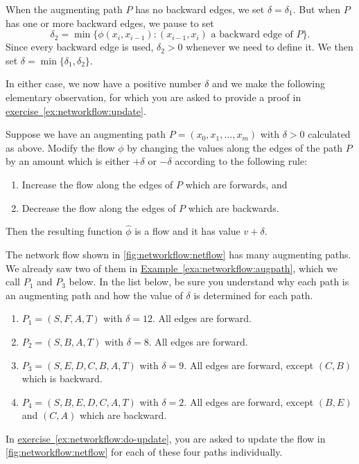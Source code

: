 When the augmenting path $P$ has no backward edges, we set $\delta=
\delta_1$.  But when $P$ has one or more backward edges, we pause
to set
\[
\delta_2 =\min\{\phi(x_{i},x_{i-1}):(x_{i-1},x_i) 
\text{ a backward edge of } P\}.
\]
Since every backward edge is used, $\delta_2>0$ whenever we need to
define it. We then set $\delta=\min\{\delta_1,\delta_2\}$.

In either case, we now have a positive number $\delta$ and we make the
following elementary observation, for which you are asked to provide a
proof in
\hyperref[ex:networkflow:update]{exercise~\ref*{ex:networkflow:update}}.

\begin{proposition}\label{prop:networkflow:update}
  Suppose we have an augmenting path $P=(x_0,x_1,\dots,x_m)$ with
  $\delta>0$ calculated as above.  Modify the flow $\phi$ by changing
  the values along the edges of the path $P$ by an amount which is
  either $+\delta$ or $-\delta$ according to the following rule:
\begin{enumerate}
\item Increase the flow along the edges of $P$ which are
forwards, and
\item Decrease the flow along the edges of $P$ which are
backwards.
\end{enumerate}
Then the resulting function $\hat{\phi}$ is a flow and it
has value $v+\delta$.
\end{proposition}

\begin{example} \label{exa:networkflow:delta}The network flow shown in
  \autoref{fig:networkflow:netflow} has many augmenting paths. We
  already saw two of them in
  \hyperref[exa:networkflow:augpath]{Example~\ref*{exa:networkflow:augpath}},
  which we call $P_1$ and $P_3$ below. In the list below, be sure you
  understand why each path is an augmenting path and how the value of
  $\delta$ is determined for each path.
  \begin{enumerate}
  \item $P_1=(S,F,A,T)$ with $\delta= 12$.  All edges are forward.
  \item $P_2=(S,B,A,T)$ with $\delta= 8$.  All edges are forward.
\item $P_3=(S,E,D,C,B,A,T)$ with $\delta= 9$. All edges are forward,
  except $(C,B)$ which is backward.
\item $P_4=(S,B,E,D,C,A,T)$ with $\delta= 2$. All edges are forward, except
$(B,E)$ and $(C,A)$ which are backward.
\end{enumerate} 
In
\hyperref[ex:networkflow:do-update]{exercise~\ref*{ex:networkflow:do-update}},
you are asked to update the flow in \autoref{fig:networkflow:netflow}
for each of these four paths individually.
\end{example}

